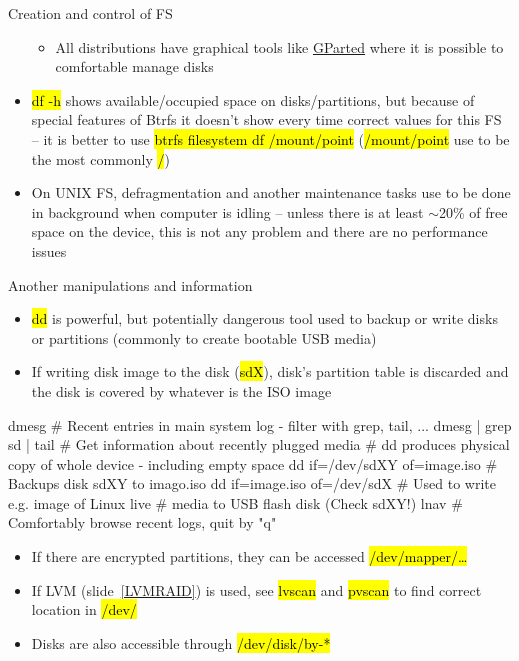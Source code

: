 \documentclass[compress, ucs, xelatex, 11pt, xcolor=svgnames,
  hyperref={
    bookmarks=true,
    unicode=true,
    colorlinks=true,
    pdftitle={Linux, command line and MetaCentrum},
    plainpages=false,
    pdfauthor={Vojtech Zeisek},
    pdfsubject={Course about use of Linux command line, writing shell scripts and using MetaCentrum of CESNET},
    pdfcreator={XeLaTeX},
    pdfkeywords={Linux, GNU, BASH, shell, command line, MetaCentrum},
    linkcolor=DarkRed,
    anchorcolor=DarkBlue,
    citecolor=Indigo,
    filecolor=NavyBlue,
    menucolor=DarkMagenta,
    urlcolor=DarkBlue,
    pdftex},
  url={hyphens, lowtilde} %
  ]{beamer}
\renewcommand{\texttt}[1]{\hl{\ttfamily #1}}
\begin{document}
\begin{frame}[allowframebreaks]{Creation and control of FS}
\begin{itemize}
\begin{itemize}
      \item All distributions have graphical tools like \href{http://gparted.org/}{GParted} where it is possible to comfortable manage disks
    \end{itemize}
    \item \texttt{df -h} shows available/occupied space on disks/partitions, but because of special features of Btrfs it doesn't show every time correct values for this FS -- it is better to use \texttt{btrfs filesystem df /mount/point} (\texttt{/mount/point} use to be the most commonly \texttt{/})
    \item On UNIX FS, defragmentation and another maintenance tasks use to be done in background when computer is idling -- unless there is at least $\sim$20\% of free space on the device, this is not any problem and there are no performance issues
  \end{itemize}
\end{frame}

\begin{frame}[fragile]{Another manipulations and information}
  \begin{itemize}
    \item \texttt{dd} is powerful, but potentially dangerous tool used to backup or write disks or partitions (commonly to create bootable USB media)
    \item If writing disk image to the disk (\texttt{sdX}), disk's partition table is discarded and the disk is covered by whatever is the ISO image
  \end{itemize}
  \begin{bashcode}
    dmesg # Recent entries in main system log - filter with grep, tail, ...
    dmesg | grep sd | tail # Get information about recently plugged media
    # dd produces physical copy of whole device - including empty space
    dd if=/dev/sdXY of=image.iso # Backups disk sdXY to imago.iso
    dd if=image.iso of=/dev/sdX # Used to write e.g. image of Linux live
                                # media to USB flash disk (Check sdXY!)
    lnav # Comfortably browse recent logs, quit by "q"
  \end{bashcode}
  \begin{itemize}
    \item If there are encrypted partitions, they can be accessed \texttt{/dev/mapper/\ldots}
    \item If LVM (slide~\ref{LVMRAID}) is used, see \texttt{lvscan} and \texttt{pvscan} to find correct location in \texttt{/dev/}
    \item Disks are also accessible through \texttt{/dev/disk/by-*}
  \end{itemize}
\end{frame}
\end{document}
